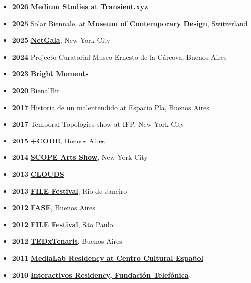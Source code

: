 \documentclass[9pt]{extarticle}
\begin{document}
\begin{itemize}

\item \textbf{2026} \href{https://www.transient.xyz/nfts/ethereum/0x16d291efbfa270835399b45c7452669caa3f8230}{\textbf{Medium Studies at Transient.xyz}}

\item \textbf{2025} Solar Biennale, at \href{https://www.instagram.com/mudaclausanne/}{\textbf{Museum of Contemporary Design}}, Switzerland

\item \textbf{2025} \href{https://thenetgala.com/}{\textbf{NetGala}}, New York City

\item \textbf{2024} Projecto Curatorial Museo Ernesto de la Cárcova, Buenos Aires

\item \textbf{2023} \href{https://www.brightmoments.io/}{\textbf{Bright Moments}}

\item \textbf{2020} BienalBit

\item \textbf{2017} Historia de un malentendido at Espacio Pla, Buenos Aires

\item \textbf{2017} Temporal Topologies show at IFP, New York City

\item \textbf{2015} \href{http://www.pluscode.cc/}{\textbf{+CODE}}, Buenos Aires

\item \textbf{2014} \href{http://scope-art.com/}{\textbf{SCOPE Arts Show}}, New York City

\item \textbf{2013} \href{http://www.cloudsdocumentary.com/}{\textbf{CLOUDS}}

\item \textbf{2013} \href{http://file.org.br/}{\textbf{FILE Festival}}, Rio de Janeiro

\item \textbf{2012} \href{http://encuentrofase.com.ar/}{\textbf{FASE}}, Buenos Aires

\item \textbf{2012} \href{http://file.org.br/}{\textbf{FILE Festival}}, São Paulo

\item \textbf{2012} \href{https://www.ted.com/tedx/events/5003}{\textbf{TEDxTenaris}}, Buenos Aires

\item \textbf{2011} \href{http://www.cceba.org.ar/v3/blog_medialab.php}{\textbf{MediaLab Residency at Centro Cultural Español}}

\item \textbf{2010} \href{http://www.fundacion.telefonica.com/en/}{\textbf{Interactivos Residency, Fundación Telefónica}} 

\end{itemize}
\end{document}
